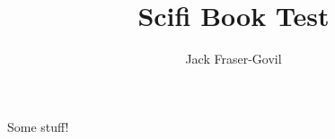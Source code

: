 \documentclass[theme=scifi]{rpgbook}
\title{Scifi Book Test}
\author{Jack Fraser-Govil}
\begin{document}
    \maketitle

    Some stuff!
\end{document}
